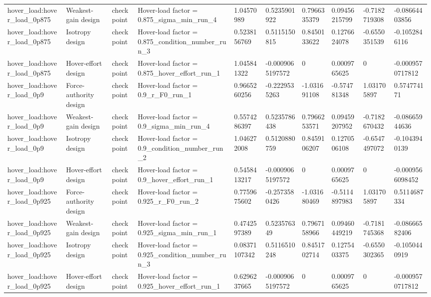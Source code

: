 \begin{tabular}{@{}llllllllll@{}}
hover\_load:hover\_load\_0p875 & Weakest-gain design & checkpoint & Hover-load factor = 0.875\_sigma\_min\_run\_4 & 1.04570989 & 0.5235901922 & 0.7966335379 & 0.09456215799 & -0.7182719308 & -0.08664403856 \\
hover\_load:hover\_load\_0p875 & Isotropy design & checkpoint & Hover-load factor = 0.875\_condition\_number\_run\_3 & 0.5238156769 & 0.5115150815 & 0.8450133622 & 0.1276624078 & -0.6550351539 & -0.1052846116 \\
hover\_load:hover\_load\_0p875 & Hover-effort design & checkpoint & Hover-load factor = 0.875\_hover\_effort\_run\_1 & 1.045841322 & -0.0009065197572 & 0 & 0.0009765625 & 0 & -0.0009570717812 \\
hover\_load:hover\_load\_0p9 & Force-authority design & checkpoint & Hover-load factor = 0.9\_r\_F0\_run\_1 & 0.9665260256 & -0.2229535263 & -1.031691108 & -0.574781348 & 1.031705897 & 0.574774171 \\
hover\_load:hover\_load\_0p9 & Weakest-gain design & checkpoint & Hover-load factor = 0.9\_sigma\_min\_run\_4 & 0.5574286397 & 0.5235786438 & 0.7966253571 & 0.09459207952 & -0.7182670432 & -0.08665944636 \\
hover\_load:hover\_load\_0p9 & Isotropy design & checkpoint & Hover-load factor = 0.9\_condition\_number\_run\_2 & 1.046272008 & 0.5120880759 & 0.8459106207 & 0.1270506108 & -0.6547497072 & -0.1043940139 \\
hover\_load:hover\_load\_0p9 & Hover-effort design & checkpoint & Hover-load factor = 0.9\_hover\_effort\_run\_1 & 0.5458413217 & -0.0009065197572 & 0 & 0.0009765625 & 0 & -0.0009566098452 \\
hover\_load:hover\_load\_0p925 & Force-authority design & checkpoint & Hover-load factor = 0.925\_r\_F0\_run\_2 & 0.7759675602 & -0.2573580426 & -1.031680469 & -0.5114897983 & 1.031705897 & 0.5114687334 \\
hover\_load:hover\_load\_0p925 & Weakest-gain design & checkpoint & Hover-load factor = 0.925\_sigma\_min\_run\_1 & 0.4742597389 & 0.523576349 & 0.7967158966 & 0.09460449219 & -0.7181745368 & -0.08666582406 \\
hover\_load:hover\_load\_0p925 & Isotropy design & checkpoint & Hover-load factor = 0.925\_condition\_number\_run\_3 & 0.08371107342 & 0.5116510248 & 0.8451702714 & 0.1275403375 & -0.6550302365 & -0.1050440919 \\
hover\_load:hover\_load\_0p925 & Hover-effort design & checkpoint & Hover-load factor = 0.925\_hover\_effort\_run\_1 & 0.6296237665 & -0.0009065197572 & 0 & 0.0009765625 & 0 & -0.0009570717812 \\

\end{tabular}
